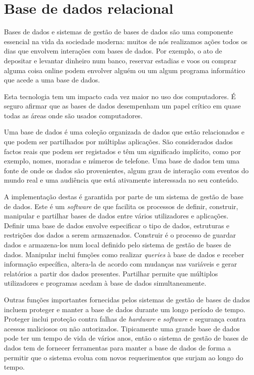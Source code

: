 \documentclass[11pt,twoside,a4paper]{report}
\begin{document}
\section{Base de dados relacional}
Bases de dados e sistemas de gestão de bases de dados são uma componente essencial na vida da sociedade moderna: muitos de nós realizamos ações todos os dias que envolvem interações com bases de dados. Por exemplo, o ato de depositar e levantar dinheiro num banco, reservar estadias e voos ou comprar alguma coisa online podem envolver alguém ou um algum programa informático que acede a uma base de dados\cite{Elmasri:2010:FDS:1855347}.\par
Esta tecnologia tem um impacto cada vez maior no uso dos computadores. É seguro afirmar que as bases de dados desempenham um papel crítico em quase todas as áreas onde são usados computadores\cite{Elmasri:2010:FDS:1855347}.\par
Uma base de dados é uma coleção organizada de dados que estão relacionados e que podem ser partilhados por múltiplas aplicações\cite{definicao_base_dados}. São considerados dados factos reais que podem ser registados e têm um significado implícito, como por exemplo, nomes, moradas e números de telefone. Uma base de dados tem uma fonte de onde os dados são provenientes, algum grau de interação com eventos do mundo real e uma audiência que está ativamente interessada no seu conteúdo\cite{Elmasri:2010:FDS:1855347}.\par
A implementação destas é garantida por parte de um sistema de gestão de base de dados. Este é um \textit{software} de que facilita os processos de definir, construir, manipular e partilhar bases de dados entre vários utilizadores e aplicações. Definir uma base de dados envolve especificar o tipo de dados, estruturas e restrições dos dados a serem armazenados. Construir é o processo de guardar dados e armazena-los num local definido pelo sistema de gestão de bases de dados. Manipular inclui funções como realizar \textit{queries} à base de dados e receber informação específica, altera-la de acordo com mudanças nas variáveis e gerar relatórios a partir dos dados presentes. Partilhar permite que múltiplos utilizadores e programas acedam à base de dados simultaneamente\cite{Elmasri:2010:FDS:1855347}.\par
Outras funções importantes fornecidas pelos sistemas de gestão de bases de dados incluem proteger e manter a base de dados durante um longo período de tempo. Proteger inclui proteção contra falhas de \textit{hardware} e \textit{software} e segurança contra acessos maliciosos ou não autorizados. Tipicamente uma grande base de dados pode ter um tempo de vida de vários anos, então o sistema de gestão de bases de dados tem de fornecer ferramentas para manter a base de dados de forma a permitir que o sistema evolua com novos requerimentos que surjam ao longo do tempo\cite{Elmasri:2010:FDS:1855347}.
\end{document}
